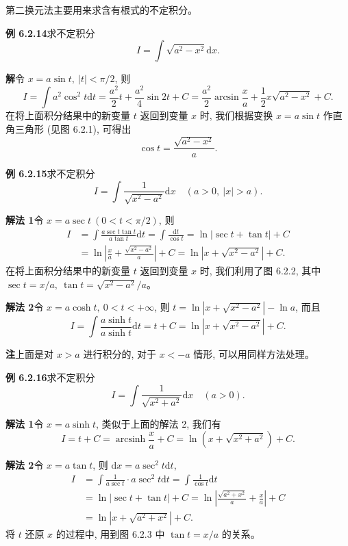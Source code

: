\documentclass[UTF8,12pt,a4paper,fontset=fandol]{ctexart}
\begin{document}
第二换元法主要用来求含有根式的不定积分。

\noindent\textbf{例 6.2.14}\quad 求不定积分
\[
  I=\int\sqrt{a^2-x^2}\mathrm dx.
\]

\noindent\textbf{解}\quad 令 $x=a\sin t,\ |t|<\pi/2$, 则
\[
  I=\int a^2\cos^2t\mathrm dt
  =
  \frac{a^2}2t+\frac{a^2}4\sin2t+C
  =
  \frac{a^2}2\arcsin\frac xa+\frac12x\sqrt{a^2-x^2}+C.
\]
在将上面积分结果中的新变量 $t$ 返回到变量 $x$ 时, 我们根据变换 $x=a\sin t$ 作直角三角形 (见图 6.2.1), 可得出
\[
  \cos t=\frac{\sqrt{a^2-x^2}}{a}.
\]

\noindent\textbf{例 6.2.15}\quad 求不定积分
\[
  I=\int\frac1{\sqrt{x^2-a^2}}\mathrm dx\quad (a>0,\ |x|>a).
\]

\noindent\textbf{解法 1}\quad 令 $x=a\sec t\ (0<t<\pi/2)$, 则
\[
\begin{aligned}
  I
  &=
  \int\frac{a\sec t\tan t}{a\tan t}\mathrm dt
  =
  \int\frac{\mathrm dt}{\cos t}
  =
  \ln|\sec t+\tan t|+C\\
  &=
  \ln\left|\frac xa+\frac{\sqrt{x^2-a^2}}a\right|+C
  =
  \ln|x+\sqrt{x^2-a^2}|+C.
\end{aligned}
\]
在将上面积分结果中的新变量 $t$ 返回到变量 $x$ 时, 我们利用了图 6.2.2, 其中 $\sec t=x/a,\ \tan t=\sqrt{x^2-a^2}/a$。

\noindent\textbf{解法 2}\quad 令 $x=a\cosh t,\ 0<t<+\infty$, 则 $t=\ln|x+\sqrt{x^2-a^2}|-\ln a$, 而且
\[
  I=\int\frac{a\sinh t}{a\sinh t}\mathrm dt
  =
  t+C
  =
  \ln|x+\sqrt{x^2-a^2}|+C.
\]

\noindent\textbf{注}\quad 上面是对 $x>a$ 进行积分的, 对于 $x<-a$ 情形, 可以用同样方法处理。

\noindent\textbf{例 6.2.16}\quad 求不定积分
\[
  I=\int\frac1{\sqrt{x^2+a^2}}\mathrm dx\quad (a>0).
\]

\noindent\textbf{解法 1}\quad 令 $x=a\sinh t$, 类似于上面的解法 2, 我们有
\[
  I=t+C=\operatorname{arcsinh}\frac xa+C
  =
  \ln(x+\sqrt{x^2+a^2})+C.
\]

\noindent\textbf{解法 2}\quad 令 $x=a\tan t$, 则 $\mathrm dx=a\sec^2t\mathrm dt$,
\[
\begin{aligned}
  I
  &=
  \int\frac1{a\sec t}\cdot a\sec^2t\mathrm dt
  =
  \int\frac1{\cos t}\mathrm dt\\
  &=
  \ln|\sec t+\tan t|+C
  =
  \ln\left|\frac{\sqrt{a^2+x^2}}a+\frac xa\right|+C\\
  &=
  \ln|x+\sqrt{a^2+x^2}|+C.
\end{aligned}
\]
将 $t$ 还原 $x$ 的过程中, 用到图 6.2.3 中 $\tan t=x/a$ 的关系。
\end{document}
